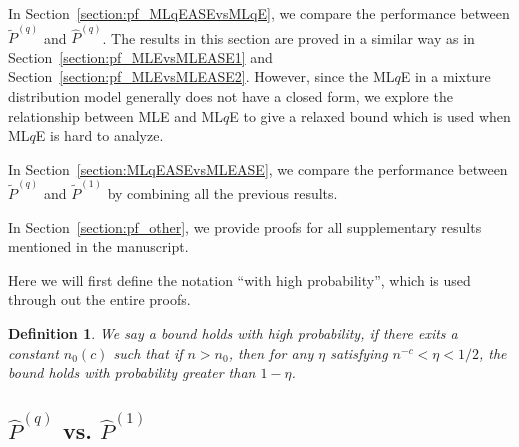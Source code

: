 \documentclass[a4paper]{article}
\newtheorem{definition}[fact]{Definition}
\renewcommand{\hat}{\widehat}
\begin{document}
In Section~\ref{section:pf_MLqEASEvsMLqE}, we compare the performance between $\widetilde{P}^{(q)}$ and $\hat{P}^{(q)}$. The results in this section are proved in a similar way as in Section~\ref{section:pf_MLEvsMLEASE1} and Section~\ref{section:pf_MLEvsMLEASE2}. However, since the ML$q$E in a mixture distribution model generally does not have a closed form, we explore the relationship between MLE and ML$q$E to give a relaxed bound which is used when ML$q$E is hard to analyze.

In Section~\ref{section:MLqEASEvsMLEASE}, we compare the performance between $\widetilde{P}^{(q)}$ and $\widetilde{P}^{(1)}$ by combining all the previous results.

In Section~\ref{section:pf_other}, we provide proofs for all supplementary results mentioned in the manuscript.

Here we will first define the notation ``with high probability'', which is used through out the entire proofs.
\begin{definition}
We say a bound holds with high probability, if there exits a constant $n_0(c)$ such that if $n > n_0$, then for any $\eta$ satisfying $n^{-c} < \eta < 1/2$, the bound holds with probability greater than $1 - \eta$.
\end{definition}

\subsection{$\hat{P}^{(q)}$ vs. $\hat{P}^{(1)}$}
\label{section:pf_MLqEvsMLE}
\end{document}
